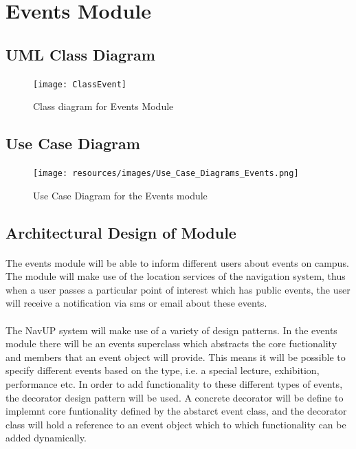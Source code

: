 \documentclass{article}
\begin{document}


\section{Events Module}
\subsection{UML Class Diagram}

\begin{figure}[H]
\centering
\texttt{[image: ClassEvent]}
\caption{Class diagram for Events Module}
\end{figure}

\subsection {Use Case Diagram}

\begin{figure}[H]
\centering
\texttt{[image: resources/images/Use\_Case\_Diagrams\_Events.png]}
\caption{Use Case Diagram for the Events module}
\end{figure}

\subsection{Architectural Design of Module}
\paragraph{}The events module will be able to inform different users about events on campus. The module will make use of the location services of the navigation system, thus when a user passes a particular point of interest which has public events, the user will receive a notification via sms or email about these events. 

\paragraph{} The NavUP system will make use of a variety of design patterns. In the events module there will be an events superclass which abstracts the core fuctionality and members that an event object will provide. This means it will be possible to specify different events based on the type, i.e. a special lecture, exhibition, performance etc. In order to add functionality to these different types of events, the decorator design pattern will be used. A concrete decorator will be define to implemnt core funtionality defined by the abstarct event class, and the decorator class will hold a reference to an event object which to which functionality can be added dynamically.
\end{document}
